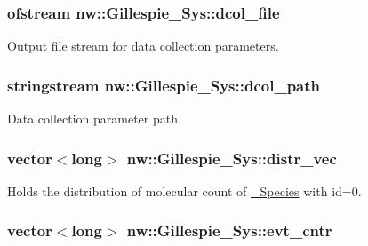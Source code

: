 \hypertarget{classnw_1_1_gillespie___sys_add6ed57b7c25852fab96b93b9acf9bff}{
\subsubsection[{dcol\+\_\+file}]{\setlength{\rightskip}{0pt plus 5cm}ofstream nw\+::\+Gillespie\+\_\+\+Sys\+::dcol\+\_\+file\hspace{0.3cm}{\ttfamily [private]}}}\label{classnw_1_1_gillespie___sys_add6ed57b7c25852fab96b93b9acf9bff}


Output file stream for data collection parameters. 

\hypertarget{classnw_1_1_gillespie___sys_a0d0bfd2a96ed9314b0189791d941fded}{
\subsubsection[{dcol\+\_\+path}]{\setlength{\rightskip}{0pt plus 5cm}stringstream nw\+::\+Gillespie\+\_\+\+Sys\+::dcol\+\_\+path\hspace{0.3cm}{\ttfamily [private]}}}\label{classnw_1_1_gillespie___sys_a0d0bfd2a96ed9314b0189791d941fded}


Data collection parameter path. 

\hypertarget{classnw_1_1_gillespie___sys_ae404ea4b9fea834a9c576778004fe0fe}{
\subsubsection[{distr\+\_\+vec}]{\setlength{\rightskip}{0pt plus 5cm}vector$<$long$>$ nw\+::\+Gillespie\+\_\+\+Sys\+::distr\+\_\+vec\hspace{0.3cm}{\ttfamily [private]}}}\label{classnw_1_1_gillespie___sys_ae404ea4b9fea834a9c576778004fe0fe}


Holds the distribution of molecular count of \hyperlink{classnw_1_1___species}{\+\_\+\+Species} with id=0. 

\hypertarget{classnw_1_1_gillespie___sys_a98aa1c6ddc1cd3307882ef3bbf646e6a}{
\subsubsection[{evt\+\_\+cntr}]{\setlength{\rightskip}{0pt plus 5cm}vector$<$long$>$ nw\+::\+Gillespie\+\_\+\+Sys\+::evt\+\_\+cntr\hspace{0.3cm}{\ttfamily [private]}}}\label{classnw_1_1_gillespie___sys_a98aa1c6ddc1cd3307882ef3bbf646e6a}


